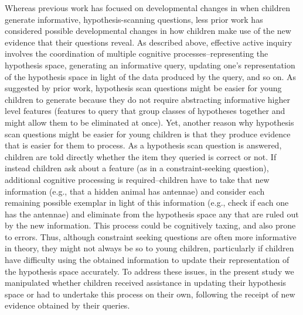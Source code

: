 \documentclass[10pt,letterpaper]{article}
\begin{document}
Whereas previous work has focused on developmental changes in when children generate informative, 
hypothesis-scanning questions, less prior work has considered possible developmental changes in how 
children make use of the new evidence that their questions reveal. As described above, effective active 
inquiry involves the coordination of multiple cognitive processes--representing the hypothesis space, 
generating an informative query, updating one's representation of the hypothesis space in light of the 
data produced by the query, and so on. As suggested by prior work, hypothesis scan questions might 
be easier for young children to generate because they do not require abstracting informative higher level 
features (features to query that group classes of hypotheses together and might allow them to be eliminated 
at once). Yet, another reason why hypothesis scan questions might be easier for young children is that they 
produce evidence that is easier for them to process. As a hypothesis scan question is answered, children 
are told directly whether the item they queried is correct or not. If instead children ask about a feature (as 
in a constraint-seeking question), additional cognitive processing is required--children have to take that 
new information (e.g., that a hidden animal has antennae) and consider each remaining possible 
exemplar in light of this information (e.g., check if each one has the antennae) and eliminate from the 
hypothesis space any that are ruled out by the new information. This process could be cognitively taxing, 
and also prone to errors. Thus, although constraint seeking questions are often more informative in 
theory, they might not always be so to young children, particularly if children have difficulty using the 
obtained information to update their representation of the hypothesis space accurately. To address 
these issues, in the present study we manipulated whether children received assistance in updating 
their hypothesis space or had to undertake this process on their own, following the receipt of new 
evidence obtained by their queries. 



%
\end{document}
